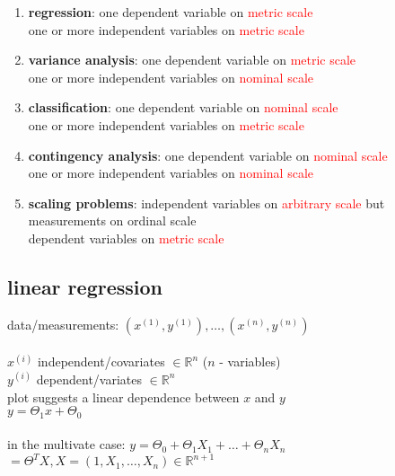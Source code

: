 	\begin{enumerate}[1.]
	 \item \textbf{regression}: one dependent variable on \textcolor{red}{metric scale}\\
	 one or more independent variables on \textcolor{red}{metric scale}
	 \item \textbf{variance analysis}: one dependent variable on \textcolor{red}{metric scale}\\
	 one or more independent variables on \textcolor{red}{nominal scale}
	 \item \textbf{classification}: one dependent variable on \textcolor{red}{nominal scale}\\
	 one or more independent variables on \textcolor{red}{metric scale}
	 \item \textbf{contingency analysis}: one dependent variable on \textcolor{red}{nominal scale}\\
	 one or more independent variables on \textcolor{red}{nominal scale}
	 \item \textbf{scaling problems}: independent variables on \textcolor{red}{arbitrary scale} but measurements on ordinal scale\\
	 dependent variables on \textcolor{red}{metric scale}
	\end{enumerate}

\subsection*{linear regression}

	data/measurements: $(x^{(1)}, y^{(1)}), \dots , (x^{(n)}, y^{(n)})$ \\\\
	$x^{(i)}$ independent/covariates $\in \mathbb{R}^n$ ($n$ - variables)\\
	$y^{(i)}$ dependent/variates $\in \mathbb{R}^n$\\
	plot suggests a linear dependence between $x$ and $y$ \\
	$y = \Theta_1 x + \Theta_0$\\\\
	in the multivate case: $y = \Theta_0 + \Theta_1 X_1 + \dots + \Theta_n X_n$\\
	$= \Theta^T X, X = (1, X_1, \dots ,X_n ) \in \mathbb{R}^{n+1}$\\\\
	
